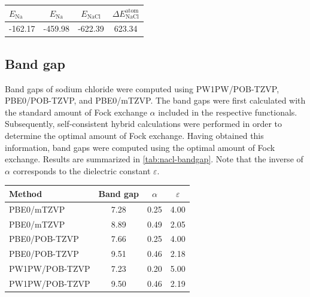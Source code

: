 \documentclass[a4paper,12pt,parskip=half]{scrartcl}
\begin{document}
\begin{table}
	\centering
	\label{tab:nacl-atom}
	\begin{tabular}{lccc}
		\toprule
		$ E_\mathrm{Na} $ & $ E_\mathrm{Na} $ & $ E_\mathrm{NaCl} $ & $ \Delta E_\mathrm{NaCl}^\mathrm{atom} $ \\
		\midrule
		-162.17           & -459.98           & -622.39             & 623.34                                   \\
		\bottomrule
	\end{tabular}
\end{table}
%
\subsection{Band gap}
%
Band gaps of sodium chloride were computed using PW1PW\autocite[]{pw1pw}/POB-TZVP\autocite[]{pob-xzvp}, PBE0/POB-TZVP, and PBE0/mTZVP\autocite[]{mtzvp}. The band gaps were first calculated with the standard amount of Fock exchange $ \alpha $ included in the respective functionals. Subsequently, self-consistent hybrid calculations were performed in order to determine the optimal amount of Fock exchange. Having obtained this information, band gaps were computed using the optimal amount of Fock exchange. Results are summarized in \autoref{tab:nacl-bandgap}. Note that the inverse of $ \alpha $ corresponds to the dielectric constant $ \varepsilon $.
%
\begin{table}
	\centering
	\label{tab:nacl-bandgap}
	\begin{tabular}{lccc}
		\toprule
		Method         & Band gap & $ \alpha $ & $ \varepsilon $ \\
		\midrule
		PBE0/mTZVP     & 7.28     & 0.25       & 4.00            \\
		PBE0/mTZVP     & 8.89     & 0.49       & 2.05            \\
		PBE0/POB-TZVP  & 7.66     & 0.25       & 4.00            \\
		PBE0/POB-TZVP  & 9.51     & 0.46       & 2.18            \\
		PW1PW/POB-TZVP & 7.23     & 0.20       & 5.00            \\
		PW1PW/POB-TZVP & 9.50     & 0.46       & 2.19            \\
		\bottomrule
	\end{tabular}
\end{table}
\end{document}
